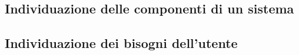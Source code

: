 \begin{figure}[h!tbp]
\end{figure}

\subsection{Individuazione delle componenti di un sistema}
\subsection{Individuazione dei bisogni dell’utente}